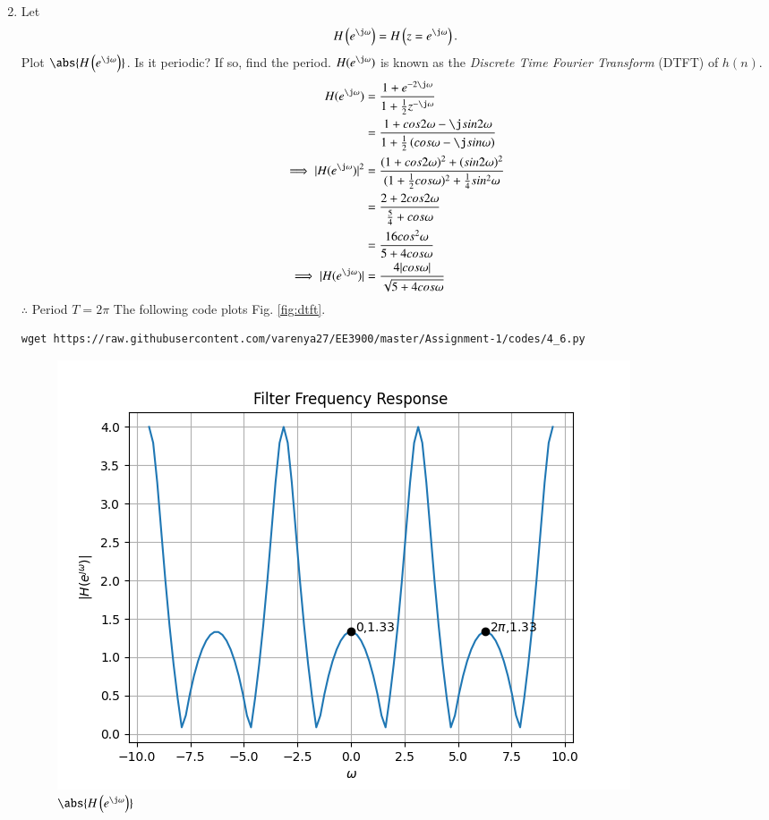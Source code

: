 \documentclass[journal,12pt,twocolumn]{IEEEtran}
\renewcommand\thesection{\arabic{section}}
\begin{document}
\begin{enumerate}[label=\thesection.\arabic*]
\begin{align}
\end{align}
\item 
Let
\begin{equation}
H\brak{e^{\j \omega}} = H\brak{z = e^{\j \omega}}.
\end{equation}
Plot $\abs{H\brak{e^{\j \omega}}}$.  Is it periodic? If so, find the period. $H(e^{\j \omega})$ is
known as the {\em Discrete Time Fourier Transform} (DTFT) of $h(n)$.\\
\solution 
\begin{align}
H(e^{\j\omega}) &= \frac{1 + e^{-2\j\omega}}{1 + \frac{1}{2}z^{-\j\omega}}\\
&= \frac{1+cos2\omega-\j sin2\omega}{1+\frac{1}{2}\brak{cos\omega-\j sin\omega}}\\
\implies |H(e^{\j\omega})|^2&= \frac{(1+cos2\omega)^2+(sin2\omega)^2}{(1+\frac{1}{2}cos\omega)^2+\frac{1}{4}sin^2\omega}\\
&= \frac{2+2cos2\omega}{\frac{5}{4}+cos\omega}\\
&= \frac{16cos^2\omega}{5+4cos\omega}\\
\implies |H(e^{\j\omega})| &= \frac{4|cos\omega|}{\sqrt{5+4cos\omega}}
\end{align}
$\therefore$ Period  $ T= 2\pi $
The following code plots Fig. \ref{fig:dtft}.
\begin{lstlisting}
wget https://raw.githubusercontent.com/varenya27/EE3900/master/Assignment-1/codes/4_6.py
\end{lstlisting}
\begin{figure}[!ht]
\centering
\includegraphics[width=\columnwidth]{figures/Figure_2.png}
\caption{$\abs{H\brak{e^{\j\omega}}}$}

\end{figure}
\end{enumerate}
\end{document}
